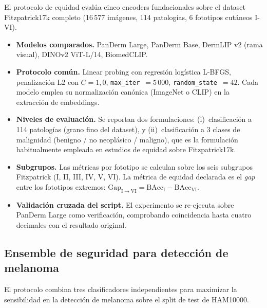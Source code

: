 El protocolo de equidad evalúa cinco encoders fundacionales sobre
el dataset Fitzpatrick17k completo (16\,577 imágenes, 114
patologías, 6 fototipos cutáneos I-VI).

\begin{itemize}
\item \textbf{Modelos comparados.} PanDerm Large, PanDerm Base,
DermLIP v2 (rama visual), DINOv2 ViT-L/14, BiomedCLIP.
\item \textbf{Protocolo común.} Linear probing con regresión
logística L-BFGS, penalización L2 con $C=1{,}0$,
\texttt{max\_iter}~$=5\,000$, \texttt{random\_state}~$=42$. Cada
modelo emplea su normalización canónica (ImageNet o CLIP) en la
extracción de embeddings.
\item \textbf{Niveles de evaluación.} Se reportan dos
formulaciones: (i)~clasificación a 114 patologías (grano fino del
dataset), y (ii)~clasificación a 3 clases de malignidad
(benigno / no neoplásico / maligno), que es la formulación
habitualmente empleada en estudios de equidad sobre
Fitzpatrick17k.
\item \textbf{Subgrupos.} Las métricas por fototipo se calculan
sobre los seis subgrupos Fitzpatrick (I, II, III, IV, V, VI). La
métrica de equidad declarada es el \emph{gap} entre los fototipos
extremos:
$\mathrm{Gap}_{\mathrm{I\to VI}} = \mathrm{BAcc}_\mathrm{I} -
\mathrm{BAcc}_\mathrm{VI}$.
\item \textbf{Validación cruzada del script.} El experimento se
re-ejecuta sobre PanDerm Large como verificación, comprobando
coincidencia hasta cuatro decimales con el resultado original.
\end{itemize}

\subsection{Ensemble de seguridad para detección de melanoma}
\label{sec:ensemble-protocol}

El protocolo combina tres clasificadores independientes para
maximizar la sensibilidad en la detección de melanoma sobre el
split de test de HAM10000.

